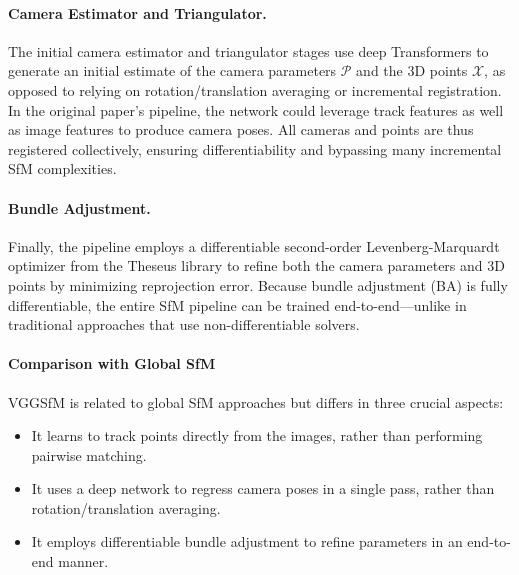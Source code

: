 \paragraph{Camera Estimator and Triangulator.}
The initial camera estimator and triangulator stages use deep Transformers to generate an initial estimate of the camera parameters $\mathcal{P}$ and the 3D points $\mathcal{X}$, as opposed to relying on rotation/translation averaging or incremental registration. 
In the original paper's pipeline, the network could leverage track features as well as image features to produce camera poses. All cameras and points are thus registered collectively, ensuring differentiability and bypassing many incremental SfM complexities.

\paragraph{Bundle Adjustment.}
Finally, the pipeline employs a differentiable second-order Levenberg-Marquardt optimizer from the Theseus library \cite{pineda2022theseus} to refine both the camera parameters and 3D points by minimizing reprojection error. 
Because bundle adjustment (BA) is fully differentiable, the entire SfM pipeline can be trained end-to-end—unlike in traditional approaches that use non-differentiable solvers.

\paragraph{Comparison with Global SfM}
VGGSfM is related to global SfM approaches but differs in three crucial aspects:
\begin{itemize}
    \item It learns to track points directly from the images, rather than performing pairwise matching.
    \item It uses a deep network to regress camera poses in a single pass, rather than rotation/translation averaging.
    \item It employs differentiable bundle adjustment to refine parameters in an end-to-end manner.
\end{itemize}

